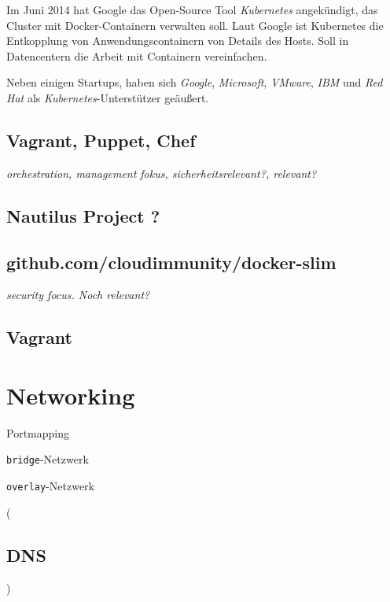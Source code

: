 \documentclass[../main.tex]{subfiles}
\begin{document}
      Im Juni 2014 hat Google das Open-Source Tool \emph{Kubernetes} angekündigt, das Cluster mit Docker-Containern verwalten soll. Laut Google ist Kubernetes die Entkopplung von Anwendungscontainern von Details des Hosts.
      Soll in Datencentern die Arbeit mit Containern vereinfachen.

      Neben einigen Startups, haben sich \emph{Google}, \emph{Microsoft}, \emph{VMware}, \emph{IBM} und \emph{Red Hat} als \emph{Kubernetes}-Unterstützer geäußert.
    \subsection{Vagrant, Puppet, Chef}
      \emph{orchestration, management fokus, sicherheitsrelevant?, relevant?}
    \subsection{Nautilus Project ?}
    \subsection{github.com/cloudimmunity/docker-slim}
      \emph{security focus. Noch relevant?}
    \subsection{Vagrant}
	\section{Networking}
    Portmapping

    \texttt{bridge}-Netzwerk

    \texttt{overlay}-Netzwerk

    (\subsection{DNS})
\end{document}
